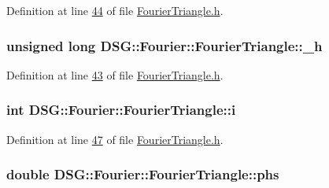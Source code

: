 Definition at line \hyperlink{_fourier_triangle_8h_source_l00044}{44} of file \hyperlink{_fourier_triangle_8h_source}{Fourier\+Triangle.\+h}.

\hypertarget{class_d_s_g_1_1_fourier_1_1_fourier_triangle_a6fe21fae0d58d6221602e4bd74c30a80}{
\subsubsection[{\+\_\+h}]{\setlength{\rightskip}{0pt plus 5cm}unsigned long D\+S\+G\+::\+Fourier\+::\+Fourier\+Triangle\+::\+\_\+h\hspace{0.3cm}{\ttfamily [protected]}}}\label{class_d_s_g_1_1_fourier_1_1_fourier_triangle_a6fe21fae0d58d6221602e4bd74c30a80}


Definition at line \hyperlink{_fourier_triangle_8h_source_l00043}{43} of file \hyperlink{_fourier_triangle_8h_source}{Fourier\+Triangle.\+h}.

\hypertarget{class_d_s_g_1_1_fourier_1_1_fourier_triangle_a041154af261bce33f4764f60b6606ea4}{
\subsubsection[{i}]{\setlength{\rightskip}{0pt plus 5cm}int D\+S\+G\+::\+Fourier\+::\+Fourier\+Triangle\+::i\hspace{0.3cm}{\ttfamily [protected]}}}\label{class_d_s_g_1_1_fourier_1_1_fourier_triangle_a041154af261bce33f4764f60b6606ea4}


Definition at line \hyperlink{_fourier_triangle_8h_source_l00047}{47} of file \hyperlink{_fourier_triangle_8h_source}{Fourier\+Triangle.\+h}.

\hypertarget{class_d_s_g_1_1_fourier_1_1_fourier_triangle_a274fb09e2f14f88ec969dcaa7ad423f4}{
\subsubsection[{phs}]{\setlength{\rightskip}{0pt plus 5cm}double D\+S\+G\+::\+Fourier\+::\+Fourier\+Triangle\+::phs\hspace{0.3cm}{\ttfamily [protected]}}}\label{class_d_s_g_1_1_fourier_1_1_fourier_triangle_a274fb09e2f14f88ec969dcaa7ad423f4}


